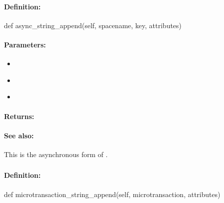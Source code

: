 \paragraph{Definition:}
\begin{pythoncode}
def async_string_append(self, spacename, key, attributes)
\end{pythoncode}

\paragraph{Parameters:}
\begin{itemize}[noitemsep]
\item {}\\

\item {}\\

\item {}\\

\end{itemize}

\paragraph{Returns:}


\paragraph{See also:}  This is the asynchronous form of .

\pagebreak
\subsubsection{}
\label{api:python:microtransaction_string_append}


\paragraph{Definition:}
\begin{pythoncode}
def microtransaction_string_append(self, microtransaction, attributes)
\end{pythoncode}

